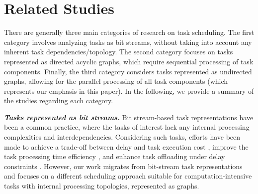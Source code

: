 \section{Related Studies}
There are generally three main categories of research on task scheduling. The first category involves analyzing tasks as bit streams, without taking into account any inherent task dependencies/topology. The second category focuses on tasks represented as directed acyclic graphs, which require sequential processing of task components. Finally, the third category considers tasks represented as undirected graphs, allowing for the parallel processing of all task components (which represents our emphasis in this paper). In the following, we provide a summary of the studies regarding each category.

\noindent
\textit{\textbf{Tasks represented as bit streams. }}Bit stream-based task representations have been a common practice, where the tasks of interest lack any internal processing complexities and interdependencies. Considering such tasks, efforts have been made to achieve a trade-off between delay and task execution cost \cite{li2022trade}, improve the task processing time efficiency \cite{alameddine2019dynamic}, and enhance task offloading under delay constraints \cite{yue2021todg,tutuncuouglu2022online}. However, our work migrates from bit-stream task representations and focuses on a different scheduling approach suitable for computation-intensive tasks with internal processing topologies, represented as graphs.

